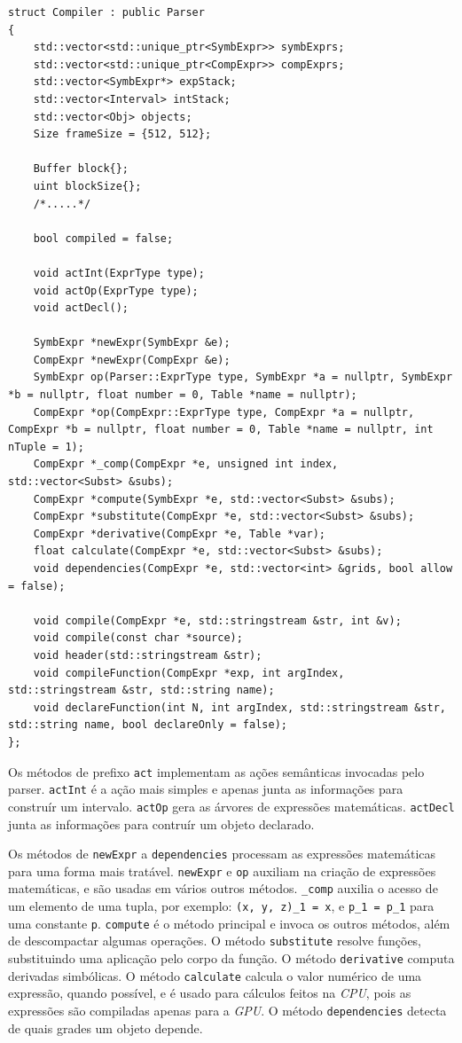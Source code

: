 \begin{lstlisting}[caption=Estrutura parcial do compilador, label=compiler]
struct Compiler : public Parser
{
    std::vector<std::unique_ptr<SymbExpr>> symbExprs;
    std::vector<std::unique_ptr<CompExpr>> compExprs;
    std::vector<SymbExpr*> expStack;
    std::vector<Interval> intStack;
    std::vector<Obj> objects;
    Size frameSize = {512, 512};

    Buffer block{};
    uint blockSize{};
    /*.....*/

    bool compiled = false;

    void actInt(ExprType type);
    void actOp(ExprType type);
    void actDecl();
    
    SymbExpr *newExpr(SymbExpr &e);
    CompExpr *newExpr(CompExpr &e);
    SymbExpr op(Parser::ExprType type, SymbExpr *a = nullptr, SymbExpr *b = nullptr, float number = 0, Table *name = nullptr);
    CompExpr *op(CompExpr::ExprType type, CompExpr *a = nullptr, CompExpr *b = nullptr, float number = 0, Table *name = nullptr, int nTuple = 1);
    CompExpr *_comp(CompExpr *e, unsigned int index, std::vector<Subst> &subs);
    CompExpr *compute(SymbExpr *e, std::vector<Subst> &subs);
    CompExpr *substitute(CompExpr *e, std::vector<Subst> &subs);
    CompExpr *derivative(CompExpr *e, Table *var);
    float calculate(CompExpr *e, std::vector<Subst> &subs);
    void dependencies(CompExpr *e, std::vector<int> &grids, bool allow = false);

    void compile(CompExpr *e, std::stringstream &str, int &v);
    void compile(const char *source);
    void header(std::stringstream &str);
    void compileFunction(CompExpr *exp, int argIndex, std::stringstream &str, std::string name);
    void declareFunction(int N, int argIndex, std::stringstream &str, std::string name, bool declareOnly = false);
};
\end{lstlisting}

Os métodos de prefixo \texttt{act} implementam as
ações semânticas invocadas pelo parser.
\texttt{actInt} é a ação mais simples e apenas junta as informações
para construír um intervalo.
\texttt{actOp} gera as árvores de expressões matemáticas.
\texttt{actDecl} junta as informações para contruír um objeto declarado.

Os métodos de \texttt{newExpr} a \texttt{dependencies} processam
as expressões matemáticas para uma forma mais tratável.
\texttt{newExpr} e \texttt{op} auxiliam na criação de expressões matemáticas, e são usadas
em vários outros métodos.
\texttt{\_comp} auxilia o acesso de um elemento de uma tupla, por exemplo:
\texttt{(x, y, z)\_1 = x}, e \texttt{p\_1 = p\_1} para uma constante \texttt{p}.
\texttt{compute} é o método principal e invoca os outros métodos, além de
descompactar algumas operações.
O método \texttt{substitute} resolve funções, substituindo uma aplicação pelo corpo da função.
O método \texttt{derivative} computa derivadas simbólicas.
O método \texttt{calculate} calcula o valor numérico de uma expressão, 
quando possível, e é usado para cálculos feitos na \textit{CPU}, pois
as expressões são compiladas apenas para a \textit{GPU}.
O método \texttt{dependencies} detecta de quais grades um objeto depende.


